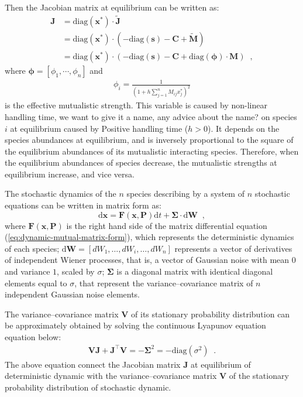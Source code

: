 \documentclass[a4paper,fleqn,12pt]{article}
\begin{document}
Then the Jacobian matrix at equilibrium can be written as:
\begin{align} \label{eq:jacobian}
\mathbf{J} &= \textrm{diag}(\mathbf{x}^*) \cdot \widetilde{\mathbf{J}} \nonumber\\
 &= \textrm{diag}(\mathbf{x}^*) \cdot ( - \mathrm{diag}(\mathbf{s}) - \mathbf{C} + \widetilde{\mathbf{M}} ) \nonumber\\
 &= \textrm{diag}(\mathbf{x}^*) \cdot ( - \mathrm{diag}(\mathbf{s}) - \mathbf{C} + \mathrm{diag}(\boldsymbol{\phi}) \cdot \mathbf{M} )  \;\; ,
\end{align}
where
$\boldsymbol{\phi} = [\phi_1, \cdots, \phi_n]$ and
\begin{align} \label{eq:phi}
\phi_i = \frac{1}{(1 + h\sum_{j=1}^nM_{ij}x_j^*)^2}
\end{align}
is {\color{red}the effective mutualistic strength. This variable is caused by non-linear handling time, we want to give it a name, any advice about the name?} on species $i$ at equilibrium caused by Positive handling time ($h>0$).
It depends on the species abundances at equilibrium, 
and is inversely proportional to the square of the equilibrium abundances of its mutualistic interacting species.
Therefore, when the equilibrium abundances of species decrease, the mutualistic strengths at equilibrium increase, and vice versa.

The stochastic dynamics of the $n$ species describing by a system of $n$ stochastic equations can be written in matrix form as:
\begin{equation} \label{eq:dynamic-mutual-stochastic-matrix-form}
\mathrm{d}\mathbf{x} = \mathbf{F}(\mathbf{x}, \mathbf{P}) \mathrm{d}t + \mathbf{\Sigma} \cdot \mathrm{d}\mathbf{W} \;\; ,
\end{equation}
where
$\mathbf{F}(\mathbf{x}, \mathbf{P})$ is the right hand side of the matrix differential equation (\ref{eq:dynamic-mutual-matrix-form}), which represents the deterministic dynamics of each species;
$\mathrm{d}\mathbf{W} = [dW_1, \ldots, dW_i, \ldots, dW_n]$ represents a vector of derivatives of independent Wiener processes, that is, a vector of Gaussian noise with mean $0$ and variance $1$, scaled by $\sigma$;
$\mathbf{\Sigma}$ is a diagonal matrix with identical diagonal elements equal to $\sigma$, that represent the variance--covariance matrix of $n$ independent Gaussian noise elements.

The variance--covariance matrix $\mathbf{V}$ of its stationary probability distribution can be approximately obtained by solving the continuous Lyapunov equation equation below\cite{gardiner_handbook_1985,neumaier_multivariate_1998,suweis_early_2014}:
\begin{align} \label{eq:mou-lyapunov}
\mathbf{V} \mathbf{J} + \mathbf{J}^\top \mathbf{V} = - \mathbf{\Sigma}^2 = 
- \mathrm{diag}(\sigma^2) \;\;.  %
\end{align}
The above equation connect the Jacobian matrix $\mathbf{J}$ at equilibrium of deterministic dynamic with the variance--covariance matrix $\mathbf{V}$ of the stationary probability distribution of stochastic dynamic.
\end{document}
